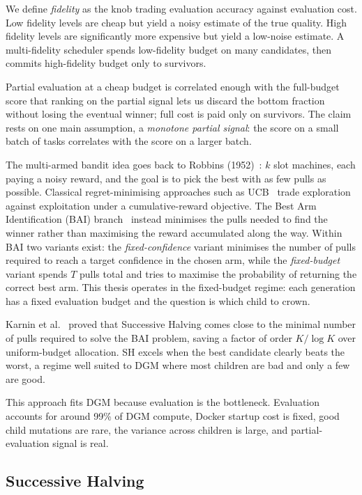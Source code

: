 We define \emph{fidelity} as the knob trading evaluation accuracy
against evaluation cost. Low fidelity levels are cheap but yield a
noisy estimate of the true quality. High fidelity levels are
significantly more expensive but yield a low-noise estimate. A
multi-fidelity scheduler spends low-fidelity budget on many candidates,
then commits high-fidelity budget only to survivors.

Partial evaluation at a cheap budget is correlated enough with the
full-budget score that ranking on the partial signal lets us discard
the bottom fraction without losing the eventual winner; full cost is
paid only on survivors. The claim rests on one main assumption, a
\emph{monotone partial signal}: the score on a small batch of tasks
correlates with the score on a larger batch.

The multi-armed bandit idea goes back to Robbins
(1952)~\cite{Robbins:52}: $k$ slot machines, each paying a noisy reward,
and the goal is to pick the best with as few pulls as possible.
Classical regret-minimising approaches such as
UCB~\cite{Auer:02} trade exploration against exploitation under a
cumulative-reward objective. The Best Arm Identification (BAI)
branch~\cite{Karnin:13} instead minimises the pulls needed to find
the winner rather than maximising the reward accumulated along the
way. Within BAI two variants exist: the
\emph{fixed-confidence} variant minimises the number of pulls required
to reach a target confidence in the chosen arm, while the
\emph{fixed-budget} variant spends $T$ pulls total and tries to
maximise the probability of returning the correct best arm. This
thesis operates in the fixed-budget regime: each generation has a
fixed evaluation budget and the question is which child to crown.

Karnin et al.~\cite{Karnin:13} proved that Successive Halving comes
close to the minimal number of pulls required to solve the BAI problem,
saving a factor of order $K / \log K$ over uniform-budget allocation.
SH excels when the best candidate clearly beats the worst, a regime
well suited to DGM where most children are bad and only a few are good.

This approach fits DGM because evaluation is the bottleneck.
Evaluation accounts for around 99\% of DGM compute, Docker startup cost
is fixed, good child mutations are rare, the variance across children
is large, and partial-evaluation signal is real.

\subsection{Successive Halving}

